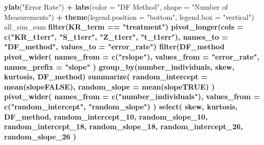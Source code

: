 \documentclass[12pt, twoside]{amherstthesis}
\newenvironment{Shaded}{\begin{snugshade}}{\end{snugshade}}
\newcommand{\DataTypeTok}[1]{\textcolor[rgb]{0.13,0.29,0.53}{#1}}
\newcommand{\DecValTok}[1]{\textcolor[rgb]{0.00,0.00,0.81}{#1}}
\newcommand{\KeywordTok}[1]{\textcolor[rgb]{0.13,0.29,0.53}{\textbf{#1}}}
\newcommand{\NormalTok}[1]{#1}
\newcommand{\OperatorTok}[1]{\textcolor[rgb]{0.81,0.36,0.00}{\textbf{#1}}}
\newcommand{\StringTok}[1]{\textcolor[rgb]{0.31,0.60,0.02}{#1}}
\begin{document}
\begin{Shaded}
\begin{Highlighting}[]
{{{{{{{{{{{{{{{\StringTok{  }\KeywordTok{ylab}\NormalTok{(}\StringTok{"Error Rate"}\NormalTok{) }\OperatorTok{+}
\StringTok{  }\KeywordTok{labs}\NormalTok{(}\DataTypeTok{color =} \StringTok{"DF Method"}\NormalTok{, }\DataTypeTok{shape =} \StringTok{"Number of Measurements"}\NormalTok{) }\OperatorTok{+}
\StringTok{  }\KeywordTok{theme}\NormalTok{(}\DataTypeTok{legend.position =} \StringTok{"bottom"}\NormalTok{, }\DataTypeTok{legend.box =} \StringTok{"vertical"}\NormalTok{)}
\NormalTok{all_sim_sum }\OperatorTok{%>%}
\StringTok{  }\KeywordTok{filter}\NormalTok{(KR_term }\OperatorTok{==}\StringTok{ "treatment"}\NormalTok{) }\OperatorTok{%>%}
\StringTok{  }\KeywordTok{pivot_longer}\NormalTok{(}\DataTypeTok{cols =} \KeywordTok{c}\NormalTok{(}\StringTok{"KR_t1err"}\NormalTok{, }\StringTok{"S_t1err"}\NormalTok{, }\StringTok{"Z_t1err"}\NormalTok{, }\StringTok{"t_t1err"}\NormalTok{), }
               \DataTypeTok{names_to =} \StringTok{"DF_method"}\NormalTok{, }\DataTypeTok{values_to =} \StringTok{"error_rate"}\NormalTok{) }\OperatorTok{%>%}
\StringTok{  }\KeywordTok{filter}\NormalTok{(DF_method }\OperatorTok{%in%}\StringTok{ }\KeywordTok{c}\NormalTok{(}\StringTok{"KR_t1err"}\NormalTok{, }\StringTok{"S_t1err"}\NormalTok{)) }\OperatorTok{%>%}
\StringTok{  }\KeywordTok{pivot_wider}\NormalTok{(}
    \DataTypeTok{names_from =} \KeywordTok{c}\NormalTok{(}\StringTok{"rslope"}\NormalTok{),}
    \DataTypeTok{values_from =} \StringTok{"error_rate"}\NormalTok{, }\DataTypeTok{names_prefix =} \StringTok{"slope"}
\NormalTok{  ) }\OperatorTok{%>%}
\StringTok{  }\KeywordTok{group_by}\NormalTok{(number_individuals, skew, kurtosis, DF_method) }\OperatorTok{%>%}
\StringTok{  }\KeywordTok{summarize}\NormalTok{(}
    \DataTypeTok{random_intercept =} \KeywordTok{mean}\NormalTok{(slopeFALSE),}
    \DataTypeTok{random_slope =} \KeywordTok{mean}\NormalTok{(slopeTRUE)}
\NormalTok{  ) }\OperatorTok{%>%}
\StringTok{  }\KeywordTok{pivot_wider}\NormalTok{(}
    \DataTypeTok{names_from =} \KeywordTok{c}\NormalTok{(}\StringTok{"number_individuals"}\NormalTok{),}
    \DataTypeTok{values_from =} \KeywordTok{c}\NormalTok{(}\StringTok{"random_intercept"}\NormalTok{, }\StringTok{"random_slope"}\NormalTok{)}
\NormalTok{  ) }\OperatorTok{%>%}
\StringTok{  }\KeywordTok{select}\NormalTok{(}
\NormalTok{    skew, kurtosis, DF_method, random_intercept_}\DecValTok{10}\NormalTok{, random_slope_}\DecValTok{10}\NormalTok{, }
\NormalTok{    random_intercept_}\DecValTok{18}\NormalTok{,}
\NormalTok{    random_slope_}\DecValTok{18}\NormalTok{, random_intercept_}\DecValTok{26}\NormalTok{, random_slope_}\DecValTok{26}
\NormalTok{  ) }\OperatorTok{%>%}
}}}}}}}}}}}}}}}}}}}}}}}}
\end{Highlighting}
\end{Shaded}
\end{document}
